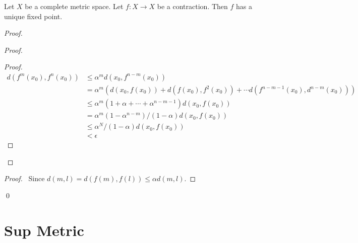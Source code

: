 \begin{proposition}
    Let $X$ be a complete metric space. Let $f : X \rightarrow X$ be a contraction.
    Then $f$ has a unique fixed point.
\end{proposition}

\begin{proof}
    \pf
    \begin{proof}
        \begin{proof}
            \pf
            \begin{align*}
                d(f^m(x_0),f^n(x_0)) & \leq \alpha^m d(x_0,f^{n-m}(x_0)) \\
                & = \alpha^m (d(x_0,f(x_0)) + d(f(x_0),f^2(x_0)) + \cdots d(f^{n-m-1}(x_0),d^{n-m}(x_0))) \\
                & \leq \alpha^m (1 + \alpha + \cdots + \alpha^{n-m-1}) d(x_0,f(x_0)) \\
                & = \alpha^m (1 - \alpha^{n-m})/(1 - \alpha) d(x_0,f(x_0))  \\
                & \leq \alpha^N / (1 - \alpha) d(x_0, f(x_0)) \\ 
                & < \epsilon
            \end{align*}
        \end{proof}
    \end{proof}
    \begin{proof}
        \pf\ Since $d(m,l) = d(f(m),f(l)) \leq \alpha d(m,l)$.
    \end{proof}
    \qed
\end{proof}


\section{Sup Metric}

